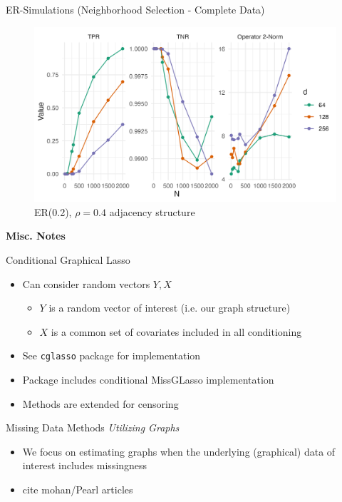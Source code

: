 \documentclass{beamer}
\begin{document}
\begin{frame}{ER-Simulations (Neighborhood Selection - Complete Data)}
    \begin{figure}
        \centering 
        \includegraphics[scale=0.65]{glasso_complete_ERmb_FixN_2.png}
        \caption{ER(0.2), $\rho=0.4$ adjacency structure}
    \end{figure}
\end{frame}



\begin{frame}{}
    \bf{\Large Misc. Notes}    
\end{frame}

\begin{frame}{Conditional Graphical Lasso}
    \begin{itemize}
        \item Can consider random vectors $Y, X$
        \begin{itemize}
            \item $Y$ is a random vector of interest (i.e. our graph structure)
            \item $X$ is a common set of covariates included in all conditioning
        \end{itemize}
        \item See \texttt{cglasso} package \cite{augugliaro_cglasso_2023} for implementation
        \item Package includes conditional MissGLasso implementation
        \item Methods are extended for censoring 
    \end{itemize}
\end{frame}


\begin{frame}{Missing Data Methods {\it Utilizing Graphs}}
    \begin{itemize}
        \item We focus on estimating graphs when the underlying (graphical) data of interest includes missingness 
        \item cite mohan/Pearl articles
    \end{itemize}
\end{frame}
    
\end{document}
